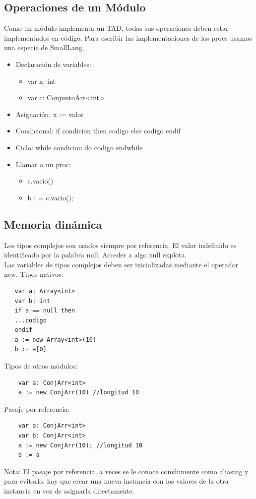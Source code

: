 \documentclass[10pt,a4paper]{article}
\begin{document}
\subsection*{Operaciones de un Módulo}
Como un módulo implementa un TAD, todas sus operaciones deben estar implementados en código.
Para escribir las implementaciones de los procs usamos una especie de SmallLang.
\begin{itemize}
    \item Declaración de variables: 
    \begin{itemize}
        \item var x: int
        \item var c: ConjuntoArr<int>
    \end{itemize}
    \item Asignación: x := valor
    \item Condicional: if condicion then codigo else codigo endif
    \item Ciclo: while condicion do codigo endwhile
    \item Llamar a un proc:
    \begin{itemize}
        \item c.vacio()
        \item b : = c.vacio();
    \end{itemize}
\end{itemize}
\subsection*{Memoria dinámica}
Los tipos complejos son usados siempre por referencia. El valor indefinido es identificado por la palabra null. Acceder a algo null explota. \\
Las variables de tipos complejos deben ser inicializadas mediante el operador new.
Tipos nativos: 
\begin{lstlisting}
   var a: Array<int>
   var b: int
   if a == null then 
   ...codigo
   endif
   a := new Array<int>(10)
   b := a[0]
\end{lstlisting}
Tipos de otros módulos: 
\begin{lstlisting}
    var a: ConjArr<int>
    a := new ConjArr(10) //longitud 10
\end{lstlisting}
Pasaje por referencia:
\begin{lstlisting}
    var a: ConjArr<int>
    var b: ConjArr<int>
    a := new ConjArr(10); //longitud 10
    b := a
\end{lstlisting}
Nota: El pasaje por referencia, a veces se le conoce comúnmente como aliasing y para evitarlo, hay que crear una nueva instancia con los valores de la otra instancia en vez de asignarla directamente.
\end{document}
